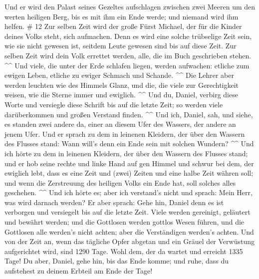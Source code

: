  Und er wird den Palast seines Gezeltes aufschlagen
zwischen zwei Meeren um den werten heiligen Berg, bis es mit ihm ein
Ende werde; und niemand wird ihm helfen. \# 12  Zur selben
Zeit wird der große Fürst Michael, der für die Kinder deines Volks
steht, sich aufmachen. Denn es wird eine solche trübselige Zeit sein,
wie sie nicht gewesen ist, seitdem Leute gewesen sind bis auf diese
Zeit. Zur selben Zeit wird dein Volk errettet werden, alle, die im Buch
geschrieben stehen. \^{}\^{}  Und viele, die unter der Erde
schlafen liegen, werden aufwachen: etliche zum ewigen Leben, etliche zu
ewiger Schmach und Schande. \^{}\^{}  Die Lehrer aber werden
leuchten wie des Himmels Glanz, und die, die viele zur Gerechtigkeit
weisen, wie die Sterne immer und ewiglich. \^{}\^{}  Und du,
Daniel, verbirg diese Worte und versiegle diese Schrift bis auf die
letzte Zeit; so werden viele darüberkommen und großen Verstand finden.
\^{}\^{}  Und ich, Daniel, sah, und siehe, es standen zwei
andere da, einer an diesem Ufer des Wassers, der andere an jenem Ufer.
 Und er sprach zu dem in leinenen Kleidern, der über den
Wassern des Flusses stand: Wann will's denn ein Ende sein mit solchen
Wundern? \^{}\^{}  Und ich hörte zu dem in leinenen
Kleidern, der über den Wassern des Flusses stand; und er hob seine
rechte und linke Hand auf gen Himmel und schwur bei dem, der ewiglich
lebt, dass es eine Zeit und (zwei) Zeiten und eine halbe Zeit währen
soll; und wenn die Zerstreuung des heiligen Volks ein Ende hat, soll
solches alles geschehen. \^{}\^{}  Und ich hörte es; aber
ich verstand's nicht und sprach: Mein Herr, was wird darnach werden?
 Er aber sprach: Gehe hin, Daniel denn es ist verborgen und
versiegelt bis auf die letzte Zeit.  Viele werden
gereinigt, geläutert und bewährt werden; und die Gottlosen werden
gottlos Wesen führen, und die Gottlosen alle werden's nicht achten; aber
die Verständigen werden's achten.  Und von der Zeit an,
wenn das tägliche Opfer abgetan und ein Gräuel der Verwüstung
aufgerichtet wird, sind 1290 Tage.  Wohl dem, der da wartet
und erreicht 1335 Tage!  Du aber, Daniel, gehe hin, bis das
Ende komme; und ruhe, dass du aufstehest zu deinem Erbteil am Ende der
Tage!
